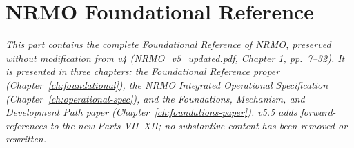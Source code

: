
\part{NRMO Foundational Reference}

\noindent\textit{This part contains the complete Foundational
Reference of NRMO, preserved without modification from v4
(NRMO\_v5\_updated.pdf, Chapter 1, pp.~7--32). It is presented in
three chapters: the Foundational Reference proper
(Chapter~\ref{ch:foundational}), the NRMO Integrated Operational
Specification (Chapter~\ref{ch:operational-spec}), and the
Foundations, Mechanism, and Development Path paper
(Chapter~\ref{ch:foundations-paper}). v5.5 adds forward-references to
the new Parts VII--XII; no substantive content has been removed or
rewritten.}





